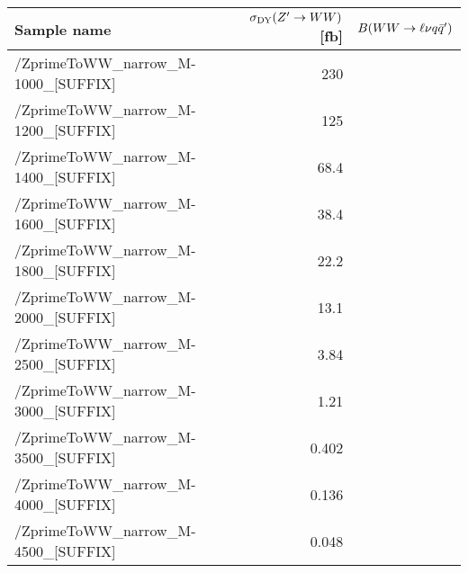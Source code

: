 \footnotesize
\begin{tabular}{lrr}
  \hline
  \textbf{Sample name} & $\sigma_{\mathrm{DY}}(Z'\to WW)$ [fb] & $B(WW\to\ell\nu q\bar{q}')$ \\
  \hline
  \ttfamily/ZprimeToWW\_narrow\_M-1000\_[SUFFIX] & 230  \\
  \ttfamily/ZprimeToWW\_narrow\_M-1200\_[SUFFIX] & 125  \\
  \ttfamily/ZprimeToWW\_narrow\_M-1400\_[SUFFIX] & 68.4  \\
  \ttfamily/ZprimeToWW\_narrow\_M-1600\_[SUFFIX] & 38.4  \\
  \ttfamily/ZprimeToWW\_narrow\_M-1800\_[SUFFIX] & 22.2  \\
  \ttfamily/ZprimeToWW\_narrow\_M-2000\_[SUFFIX] & 13.1  \\
  \ttfamily/ZprimeToWW\_narrow\_M-2500\_[SUFFIX] & 3.84  \\
  \ttfamily/ZprimeToWW\_narrow\_M-3000\_[SUFFIX] & 1.21  \\
  \ttfamily/ZprimeToWW\_narrow\_M-3500\_[SUFFIX] & 0.402  \\
  \ttfamily/ZprimeToWW\_narrow\_M-4000\_[SUFFIX] & 0.136  \\
  \ttfamily/ZprimeToWW\_narrow\_M-4500\_[SUFFIX] & 0.048  \\
  \hline
\end{tabular}
